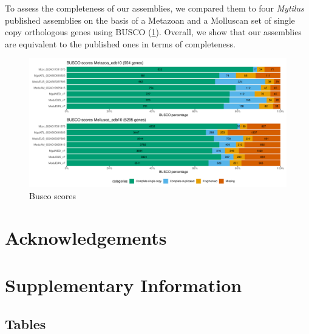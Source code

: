 \documentclass[11pt, a4paper]{article}
\begin{document}
\begin{landscape}
	
\end{landscape}


To assess the completeness of our assemblies, we compared them to four \textit{Mytilus} published assemblies on the basis of a Metazoan and a Molluscan set of single copy orthologous genes using BUSCO (\cref{fig:busco}).
Overall, we show that our assemblies are equivalent to the published ones in terms of completeness.

\begin{figure}[h]
	\includegraphics[width=\linewidth]{figures/Fig2_busco.pdf}
	\caption{Busco scores}
	\label{fig:busco}
\end{figure}





\section*{Acknowledgements}


\printbibliography


\newpage
\appendix
\setcounter{table}{0}
\renewcommand{\thetable}{S\arabic{table}}
\setcounter{figure}{0}
\renewcommand{\thefigure}{S\arabic{figure}}
\section*{Supplementary Information}

\subsection*{Tables}
\end{document}
